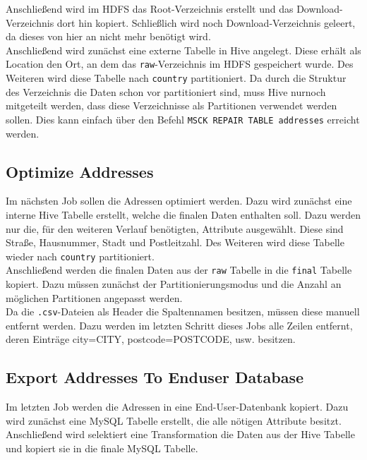 \documentclass[
	a4paper,
	12p,
	bibliography=totocnumbered
]{scrartcl}
\begin{document}
Anschließend wird im HDFS das Root-Verzeichnis erstellt und das Download-Verzeichnis dort hin kopiert. Schließlich wird noch Download-Verzeichnis  geleert, da dieses von hier an nicht mehr benötigt wird.\\

Anschließend wird zunächst eine externe Tabelle in Hive angelegt. Diese erhält als Location den Ort, an dem das \texttt{raw}-Verzeichnis im HDFS gespeichert wurde. Des Weiteren wird diese Tabelle nach \texttt{country} partitioniert. Da durch die Struktur des Verzeichnis die Daten schon vor partitioniert sind, muss Hive nurnoch mitgeteilt werden, dass diese Verzeichnisse als Partitionen verwendet werden sollen. Dies kann einfach über den Befehl \texttt{MSCK REPAIR TABLE addresses} erreicht werden.


\subsection{Optimize Addresses}

Im nächsten Job sollen die Adressen optimiert werden. Dazu wird zunächst eine interne Hive Tabelle erstellt, welche die finalen Daten enthalten soll. Dazu werden nur die, für den weiteren Verlauf benötigten, Attribute ausgewählt. Diese sind Straße, Hausnummer, Stadt und Postleitzahl. Des Weiteren wird diese Tabelle wieder nach \texttt{country} partitioniert.\\

Anschließend werden die finalen Daten aus der \texttt{raw} Tabelle in die \texttt{final} Tabelle kopiert. Dazu müssen zunächst der Partitionierungsmodus und die Anzahl an möglichen Partitionen angepasst werden.\\

Da die \texttt{.csv}-Dateien als Header die Spaltennamen besitzen, müssen diese manuell entfernt werden. Dazu werden im letzten Schritt dieses Jobs alle Zeilen entfernt, deren Einträge city=\glqq CITY\grqq{}, postcode=\glqq POSTCODE\grqq{}, usw. besitzen.

	
\subsection{Export Addresses To Enduser Database}

Im letzten Job werden die Adressen in eine End-User-Datenbank kopiert. Dazu wird zunächst eine MySQL Tabelle erstellt, die alle nötigen Attribute besitzt. Anschließend wird selektiert eine Transformation die Daten aus der Hive Tabelle und kopiert sie in die finale MySQL Tabelle.
\end{document}
